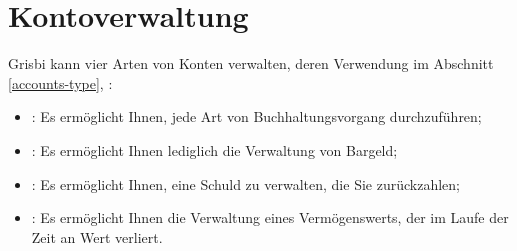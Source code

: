 

\chapter{Kontoverwaltung\label{accounts}}%

Grisbi kann vier Arten von Konten verwalten, deren Verwendung im Abschnitt \vref{accounts-type}, :
\begin{itemize}
	\item {}: Es ermöglicht Ihnen, jede Art von Buchhaltungsvorgang durchzuführen;
	\item {}: Es ermöglicht Ihnen lediglich die Verwaltung von Bargeld;
	\item {}: Es ermöglicht Ihnen, eine Schuld zu verwalten, die Sie zurückzahlen;
	\item {}: Es ermöglicht Ihnen die Verwaltung eines Vermögenswerts, der im Laufe der Zeit an Wert verliert.
\end{itemize}


